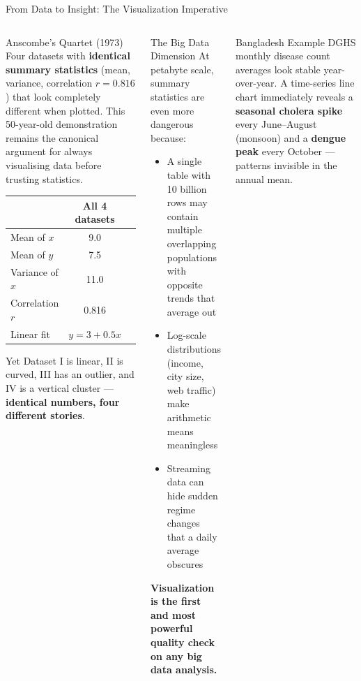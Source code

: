 \documentclass[aspectratio=169,10pt]{beamer}
\begin{document}
\begin{frame}{From Data to Insight: The Visualization Imperative}
  \begin{columns}[T]
      \begin{block}{Anscombe's Quartet (1973)}
        Four datasets with \textbf{identical summary statistics} (mean, variance, correlation $r = 0.816$) that look completely different when plotted.  This 50-year-old demonstration remains the canonical argument for always visualising data before trusting statistics.
        \vspace{4pt}
        \begin{center}
        \renewcommand{\arraystretch}{1.2}
        \begin{tabular}{lcc}
          \toprule
          & \textbf{All 4 datasets} \\
          \midrule
          Mean of $x$ & 9.0 \\
          Mean of $y$ & 7.5 \\
          Variance of $x$ & 11.0 \\
          Correlation $r$ & 0.816 \\
          Linear fit & $y = 3 + 0.5x$ \\
          \bottomrule
        \end{tabular}
        \end{center}
        Yet Dataset I is linear, II is curved, III has an outlier, and IV is a vertical cluster --- \textbf{identical numbers, four different stories}.
      \end{block}

      \begin{alertblock}{The Big Data Dimension}
        \small At petabyte scale, summary statistics are even more dangerous because:
        \begin{itemize}
          \item A single table with 10 billion rows may contain multiple overlapping populations with opposite trends that average out
          \item Log-scale distributions (income, city size, web traffic) make arithmetic means meaningless
          \item Streaming data can hide sudden regime changes that a daily average obscures
        \end{itemize}
        \textbf{Visualization is the first and most powerful quality check on any big data analysis.}
      \end{alertblock}
      \vspace{6pt}
      \begin{exampleblock}{Bangladesh Example}
        \small DGHS monthly disease count averages look stable year-over-year.  A time-series line chart immediately reveals a \textbf{seasonal cholera spike} every June--August (monsoon) and a \textbf{dengue peak} every October --- patterns invisible in the annual mean.
      \end{exampleblock}
  \end{columns}
\end{frame}
\end{document}
